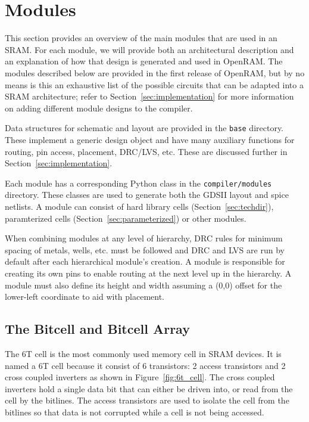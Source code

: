 \section{Modules}
\label{sec:modules}

This section provides an overview of the main modules that are used in
an SRAM.  For each module, we will provide both an architectural
description and an explanation of how that design is generated and
used in OpenRAM.  The modules described below are provided in the
first release of OpenRAM, but by no means is this an exhaustive list
of the possible circuits that can be adapted into a SRAM architecture;
refer to Section~\ref{sec:implementation} for more information on
adding different module designs to the compiler.

Data structures for schematic and layout are provided in the
\verb|base| directory. These implement a generic design object and
have many auxiliary functions for routing, pin access, placement,
DRC/LVS, etc.  These are discussed further in
Section~\ref{sec:implementation}.

Each module has a corresponding Python class in the
\verb|compiler/modules| directory.  These classes are used to generate
both the GDSII layout and spice netlists. A module can consist of
hard library cells (Section~\ref{sec:techdir}), paramterized
cells (Section~\ref{sec:parameterized}) or other modules.

When combining modules at any level of hierarchy, DRC rules for
minimum spacing of metals, wells, etc. must be followed and DRC and
LVS are run by default after each hierarchical module's creation. A
module is responsible for creating its own pins to enable routing
at the next level up in the hierarchy. A module must also define its
height and width assuming a (0,0) offset for the lower-left coordinate
to aid with placement.


\subsection{The Bitcell and Bitcell Array}
\label{sec:bitcellarray}

The 6T cell is the most commonly used memory cell in SRAM devices.  It
is named a 6T cell because it consist of 6 transistors: 2 access
transistors and 2 cross coupled inverters as shown in
Figure~\ref{fig:6t_cell}.  The cross coupled inverters hold a single
data bit that can either be driven into, or read from the cell by the
bitlines.  The access transistors are used to isolate the cell from
the bitlines so that data is not corrupted while a cell is not being
accessed.

